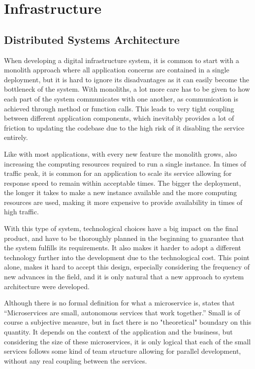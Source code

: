 \chapter{Infrastructure} 
\label{chap:infrastructure}

\section{Distributed Systems Architecture}

When developing a digital infrastructure system, it is common to start with a
monolith approach where all application concerns are contained in a single
deployment, but it is hard to ignore its disadvantages as it can easily become
the bottleneck of the system. With monoliths, a lot more care has to be given to
how each part of the system communicates with one another, as communication is
achieved through method or function calls. This leads to very tight coupling
between different application components, which inevitably provides a lot of
friction to updating the codebase due to the high risk of it disabling the
service entirely.

Like with most applications, with every new feature the monolith grows, also
increasing the computing resources required to run a single instance. In times
of traffic peak, it is common for an application to scale its service allowing
for response speed to remain within acceptable times. The bigger the deployment,
the longer it takes to make a new instance available and the more computing
resources are used, making it more expensive to provide availability in times of
high traffic.

With this type of system, technological choices have a big impact on the final
product, and have to be thoroughly planned in the beginning to guarantee that
the system fulfills its requirements. It also makes it harder to adopt a
different technology further into the development due to the technological cost.
This point alone, makes it hard to accept this design, especially considering
the frequency of new advances in the field, and it is only natural that a new
approach to system architecture were developed.

Although there is no formal definition for what a microservice is,
\cite[Chapter~1]{newman2015building} states that ``Microservices are small,
autonomous services that work together.'' Small is of course a subjective
measure, but in fact there is no "theoretical" boundary on this quantity. It
depends on the context of the application and the business, but considering the
size of these microservices, it is only logical that each of the small services
follows some kind of team structure allowing for parallel development, without
any real coupling between the services. 

